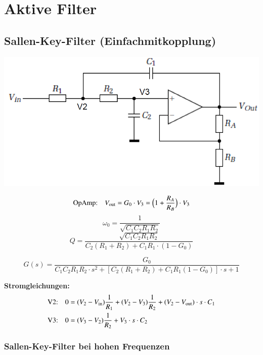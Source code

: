 \section{Aktive Filter} 

\subsection{Sallen-Key-Filter (Einfachmitkopplung)}

\begin{minipage}[c]{0.4\columnwidth}
    \includegraphics[width=\columnwidth]{images/sallen_key.png}
\end{minipage}
\hfill
\begin{minipage}[c]{0.58\columnwidth}
    $$ \text{OpAmp:} \quad  V_{\rm out} = G_0 \cdot V_3 = \Big(1 + \frac{R_A}{R_B} \Big) \cdot V_3 $$
    $$ \omega_0 = \frac{1}{\sqrt{C_1 C_2 R_1 R_2}} $$
    $$ Q = \frac{\sqrt{C_1 C_2 R_1 R_2}}{ C_2 (R_1 + R_2) + C_1 R_1 \cdot (1 - G_0)} $$
\end{minipage}

$$ \boxed{ G(s) = \frac{G_0}{ C_1 C_2 R_1 R_2 \cdot s^2 + [ C_2 (R_1 + R_2) + C_1 R_1 (1 - G_0) ] \cdot s + 1} } $$

\textbf{Stromgleichungen:}
\begin{align*}
    \text{V2:} \quad 0 &= (V_2 - V_{\rm in}) \frac{1}{R_1} + (V_2 - V_3) \frac{1}{R_2} + (V_2 - V_{\rm out}) \cdot s \cdot C_1  \\
    \text{V3:} \quad 0 &= (V_3 - V_2) \frac{1}{R_2} + V_3  \cdot s \cdot C_2 
\end{align*}


\subsubsection{Sallen-Key-Filter bei hohen Frequenzen}

